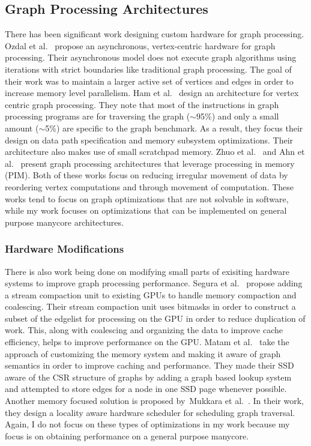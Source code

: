 \subsection{Graph Processing Architectures} There has been significant work designing custom hardware for graph processing.
Ozdal et al.~\cite{ozdal2016energy} propose an asynchronous, vertex-centric hardware for graph processing. 
Their asynchronous model does not execute graph algorithms using iterations with strict boundaries like traditional graph processing. 
The goal of their work was to maintain a larger active set of vertices and edges in order to increase memory level parallelism. 
Ham et al.~\cite{ham2016graphicionado} design an architecture for vertex centric graph processing. 
They note that most of the instructions in graph processing programs are for traversing the graph ($\sim$95\%) and only a small amount ($\sim$5\%) are specific to the graph benchmark. 
As a result, they focus their design on data path specification and memory subsystem optimizations.
Their architecture also makes use of small scratchpad memory.
Zhuo et al.~\cite{zhuo2019graphq} and Ahn et al.~\cite{ahn2016scalable} present graph processing architectures that leverage processing in memory (PIM).
Both of these works focus on reducing irregular movement of data by reordering vertex computations and through movement of computation.
These works tend to focus on graph optimizations that are not solvable in software, while my work focuses on optimizations that can be implemented on general purpose manycore architectures.

\subsubsection{Hardware Modifications} There is also work being done on modifying small parts of exisiting hardware systems to improve graph processing performance. 
Segura et al.~\cite{segura2019scu} propose adding a stream compaction unit to existing GPUs to handle memory compaction and coalescing.
Their stream compaction unit uses bitmasks in order to construct a subset of the edgelist for processing on the GPU in order to reduce duplication of work. 
This, along with coalescing and organizing the data to improve cache efficiency, helps to improve performance on the GPU.
Matam et al.~\cite{matam2019graphssd} take the approach of customizing the memory system and making it aware of graph semantics in order to improve caching and performance. 
They made their SSD aware of the CSR structure of graphs by adding a graph based lookup system and attempted to store edges for a node in one SSD page whenever possible.
Another memory focused solution is proposed by~Mukkara et al.~\cite{mukkara2018exploiting}.
In their work, they design a locality aware hardware scheduler for scheduling graph traversal.
Again, I do not focus on these types of optimizations in my work because my focus is on obtaining performance on a general purpose manycore.

